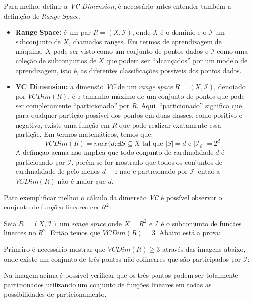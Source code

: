 Para melhor definir a \textit{VC-Dimension}, é necessário antes entender também a definição de \textit{Range Space}.

\begin{itemize}
    \item \textbf{Range Space:} é um par $R = (X, \mathcal{I})$, onde $X$ é o domínio e o $\mathcal{I}$ um subconjunto de $X$, chamados ranges. Em termos de aprendizagem de máquina, $X$ pode ser visto como um conjunto de pontos dados e $\mathcal{I}$ como uma coleção de subconjuntos de $X$ que podem ser “alcançados” por um modelo de aprendizagem, isto é, as diferentes classificações possíveis dos pontos dados.

    \item \textbf{VC Dimension:} a dimensão \textit{VC} de um \textit{range space} $R = (X, \mathcal{I})$, denotado por $VCDim(R)$, é o tamanho máximo de um conjunto de pontos que pode ser completamente “particionado” por $R$. Aqui, “particionado” significa que, para qualquer partição possível dos pontos em duas classes, como positivo e negativo, existe uma função em $R$ que pode realizar exatamente essa partição. Em termos matemáticos, temos que:\begin{equation}
        VCDim(R) = max \{d: \exists S \subseteq X \text{ tal que } |S| = d \text{ e } |\mathcal{I_S}| = 2^d
    \end{equation} A definição acima não implica que todo conjunto de cardinalidade $d$ é particionado por $\mathcal{I}$, porém se for mostrado que todos os conjuntos de cardinalidade de pelo menos $d + 1$ não é particionado por $\mathcal{I}$, então a $VCDim(R)$ não é maior que $d$.
\end{itemize}

Para exemplificar melhor o cálculo da dimensão \textit{VC} é possível observar o conjunto de funções lineares em $R^2$:

Seja $R = (X, \mathcal{I})$ um \textit{range space} onde $X = R^2$ e $\mathcal{I}$ é o subconjunto de funções lineares no $R^2$. Então temos que $VCDim(R) = 3$. Abaixo está a prova:

Primeiro é necessário mostrar que $VCDim(R) \geq 3$ através das imagens abaixo, onde existe um conjunto de três pontos não colineares que são participados por $\mathcal{I}$:


Na imagem acima é possível verificar que os três pontos podem ser totalmente particionados utilizando um conjunto de funções lineares em todas as possibilidades de particionamento.

